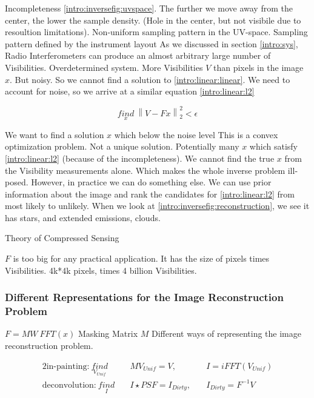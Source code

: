Incompleteness \ref{intro:inversefig:uvspace}. The further we move away from the center, the lower the sample density. (Hole in the center, but not visibile due to resoultion limitations). Non-uniform sampling pattern in the UV-space. Sampling pattern defined by the instrument layout
As we discussed in section \ref{intro:sys}, Radio Interferometers can produce an almost arbitrary large number of Visibilities.
Overdetermined system. More Visibilities $V$ than pixels in the image $x$.
But noisy. So we cannot find a solution to  \eqref{intro:linear:linear}. We need to account for noise, so we arrive at a similar equation \eqref{intro:linear:l2}

\begin{equation}\label{intro:linear:l2}
\underset{x}{find} \: \left \| V - Fx \right \|_2^2 < \epsilon
\end{equation}

We want to find a solution $x$ which below the noise level
This is a convex optimization problem.
Not a unique solution. Potentially many $x$ which satisfy \eqref{intro:linear:l2} (because of the incompleteness).
We cannot find the true $x$ from the Visibility measurements alone. 
Which makes the whole inverse problem ill-posed.
However, in practice we can do something else. We can use prior information about the image and rank the candidates for \eqref{intro:linear:l2} from most likely to unlikely.
When we look at \ref{intro:inversefig:reconstruction}, we see it has stars, and extended emissions, clouds. 

Theory of Compressed Sensing

$F$ is too big for any practical application. It has the size of pixels times Visibilities. 4k*4k pixels, times 4 billion Visibilities.


\subsubsection{Different Representations for the Image Reconstruction Problem}
$F = M W\: FFT(x)$
Masking Matrix $M$
Different ways of representing the image reconstruction problem.

\begin{alignat}{2}
\text{in-painting:}\: \underset{V_{Unif}}{find}&\quad MV_{Unif} = V,  \quad &I = iFFT(V_{Unif})\\
\text{deconvolution:}\: \underset{I}{find}&\quad I \star PSF = I_{Dirty},  \quad &I_{Dirty} = F^{-1}V
\end{alignat}

